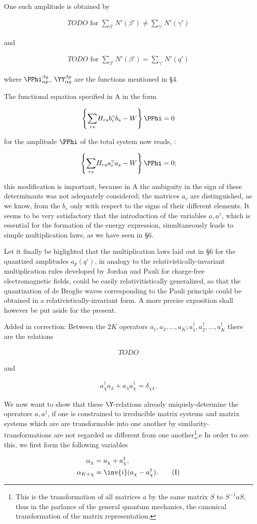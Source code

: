 \documentclass{article}
\newcommand{\nequ}[2]{
\begin{align*}
#1
\tag{#2}
\end{align*}
}
\newcommand{\uequ}[1]{
\begin{align*}
#1
\end{align*}
}
\newcommand{\sumX}[1]{\underset{#1}{\sum}}
\begin{document}
One such amplitude is obtained by
\uequ{
TODO \text{ for } \sumX{\beta'}N'(\beta') \neq \sumX{\gamma'}N'(\gamma')
}
and
\nequ{
TODO \text{ for } \sumX{\beta'}N'(\beta') = \sumX{\gamma'}N'(q')
}{74}
where $\PPhi^{\beta q}_{\alpha p}$, $\YY^{\beta p}_{\alpha q}$ are the functions mentioned in §4.

The functional equation specified in A in the form
\uequ{
\left\{
\sumX{rs}H_{rs} b^\gamma_r b_s - W
\right\}\PPhi = 0
}
for the amplitude $\PPhi$ of the total system now reads, :
\uequ{
\left\{
\sumX{rs}H_{rs} a^\gamma_r a_s - W
\right\}\PPhi = 0;
}
this modification is important, because in A the ambiguity in the sign of these determinants was not adequately considered; the matrices $a_r$ are distinguished, as we know, from the $b_r$ only with respect to the signs of their different elements. It seems to be very satisfactory that the introduction of the variables $a,a^\dagger$, which is essential for the formation of the energy expression, simultaneously leads to simple multiplication laws, as we have seen in §6.

Let it finally be higlighted that the multiplication laws laid out in §6 for the quantized amplitudes $a_p(q')$, in analogy to the relativistically-invariant multiplication rules developed by Jordan and Pauli for charge-free electromagnetic fields, could be easily relativitistically generalized, so that the quantization of de Broglie waves corresponding to the Pauli principle could be obtained in a relativistically-invariant form. A more precise exposition shall however be put aside for the present. 

Added in correction: Between the $2K$ operators $a_1,a_2,...,a_K; a^\dagger_1,a^\dagger_2,...,a^\dagger_K$ there are the relations
\nequ{
TODO
}{36}
and
\nequ{
a^\dagger_\chi a_\lambda + a_\lambda a^\dagger_\chi = \delta_{\chi\lambda}.
}{40}

We now want to show that these $\Y$-relations already uniquely-determine the operators $a,a^\dagger$, if one is constrained to irreducible matrix systems and matrix systems which are are transformable into one another by similarity-transformations are not regarded as different from one another\footnote{This is the transformation of all matrices $a$ by the same matrix $S$ to $S^{-1}aS$, thus in the parlance of the general quantum mechanics, the canonical transformation of the matrix representation.}.e
In order to see this, we first form the following variables
\nequ{
\alpha_\chi &= a_\chi + a^\dagger_\chi,\\
\alpha_{K+\chi} &= \inv{i}(a_\chi - a^\dagger_\chi).
}{I}
\end{document}
